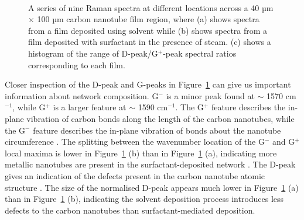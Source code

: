 \documentclass[
  a4paper,
]{scrbook}
\begin{document}
\begin{figure}
\begin{minipage}[t]{0.72\linewidth}
{{}

}

\end{minipage}%
%
\begin{minipage}[t]{0.14\linewidth}

{\centering 

~

}

\end{minipage}%

\caption{\label{fig-pristine-raman}A series of nine Raman spectra at
different locations across a 40 µm \(\times\) 100 µm carbon nanotube
film region, where (a) shows spectra from a film deposited using solvent
while (b) shows spectra from a film deposited with surfactant in the
presence of steam. (c) shows a histogram of the range of
D-peak/G\(^+\)-peak spectral ratios corresponding to each film.}

\end{figure}

Closer inspection of the D-peak and G-peaks in
Figure~\ref{fig-pristine-raman} can give us important information about
network composition. G\(^-\) is a minor peak found at \(\sim\) 1570
cm\(^{-1}\), while G\(^+\) is a larger feature at \(\sim\) 1590
cm\(^{-1}\). The G\(^+\) feature describes the in-plane vibration of
carbon bonds along the length of the carbon nanotubes, while the G\(^-\)
feature describes the in-plane vibration of bonds about the nanotube
circumference \autocite{King2014,Swiniarski2021}. The splitting between
the wavenumber location of the G\(^-\) and G\(^+\) local maxima is lower
in Figure~\ref{fig-pristine-raman} (b) than in
Figure~\ref{fig-pristine-raman} (a), indicating more metallic nanotubes
are present in the surfactant-deposited network
\autocite{Swiniarski2021}. The D-peak gives an indication of the defects
present in the carbon nanotube atomic structure
\autocite{King2014,Swiniarski2021}. The size of the normalised D-peak
appears much lower in Figure~\ref{fig-pristine-raman} (a) than in
Figure~\ref{fig-pristine-raman} (b), indicating the solvent deposition
process introduces less defects to the carbon nanotubes than
surfactant-mediated deposition.
\end{document}
